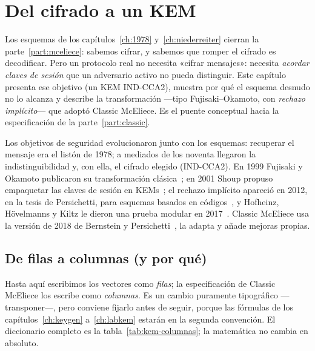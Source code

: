 \documentclass[11pt,a4paper,oneside]{report}
\begin{document}
\chapter{Del cifrado a un KEM}\label{ch:kem}

\begin{roadmap}
Los esquemas de los capítulos~\ref{ch:1978} y~\ref{ch:niederreiter}
cierran la parte~\ref{part:mceliece}: sabemos cifrar, y sabemos que
romper el cifrado es decodificar. Pero un protocolo real no necesita
«cifrar mensajes»: necesita \emph{acordar claves de sesión} que un
adversario activo no pueda distinguir. Este capítulo presenta ese
objetivo (un KEM IND-CCA2), muestra por qué el esquema desnudo no lo
alcanza y describe la transformación ---tipo Fujisaki--Okamoto, con
\emph{rechazo implícito}--- que adoptó Classic McEliece. Es el puente
conceptual hacia la especificación de la parte~\ref{part:classic}.
\end{roadmap}

\begin{historia}
Los objetivos de seguridad evolucionaron junto con los esquemas:
recuperar el mensaje era el listón de 1978; a mediados de los noventa
llegaron la indistinguibilidad y, con ella, el cifrado elegido
(IND-CCA2). En 1999 Fujisaki y Okamoto publicaron su transformación
clásica~\cite{foj1999}; en 2001 Shoup propuso empaquetar las claves de
sesión en KEMs~\cite{shoup2001}; el rechazo implícito apareció en 2012,
en la tesis de Persichetti, para esquemas basados en
códigos~\cite{persichetti2012}, y Hofheinz, Hövelmanns y Kiltz le
dieron una prueba modular en 2017~\cite{hhk2017}. Classic McEliece usa
la versión de 2018 de Bernstein y Persichetti~\cite{bp2018}, la adapta
y añade mejoras propias.
\end{historia}

\section{De filas a columnas (y por qué)}

Hasta aquí escribimos los vectores como \emph{filas}; la especificación
de Classic McEliece los escribe como \emph{columnas}. Es un cambio
puramente tipográfico ---transponer---, pero conviene fijarlo antes de
seguir, porque las fórmulas de los capítulos~\ref{ch:keygen}
a~\ref{ch:labkem} estarán en la segunda convención. El diccionario
completo es la tabla~\ref{tab:kem-columnas}; la matemática no cambia
en absoluto.
\end{document}
